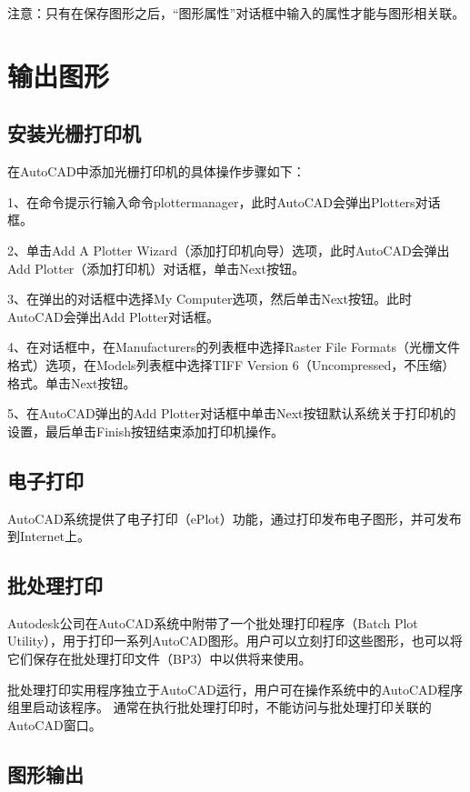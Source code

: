 注意：只有在保存图形之后，“图形属性”对话框中输入的属性才能与图形相关联。

\chapter{输出图形}





\section{安装光栅打印机}

在AutoCAD中添加光栅打印机的具体操作步骤如下：

1、在命令提示行输入命令plottermanager，此时AutoCAD会弹出Plotters对话框。

2、单击Add A Plotter Wizard（添加打印机向导）选项，此时AutoCAD会弹出Add Plotter（添加打印机）对话框，单击Next按钮。

3、在弹出的对话框中选择My Computer选项，然后单击Next按钮。此时AutoCAD会弹出Add Plotter对话框。

4、在对话框中，在Manufacturers的列表框中选择Raster File Formats（光栅文件格式）选项，在Models列表框中选择TIFF Version 6（Uncompressed，不压缩）格式。单击Next按钮。

5、在AutoCAD弹出的Add Plotter对话框中单击Next按钮默认系统关于打印机的设置，最后单击Finish按钮结束添加打印机操作。

\section{电子打印}

AutoCAD系统提供了电子打印（ePlot）功能，通过打印发布电子图形，并可发布到Internet上。

\section{批处理打印}

Autodesk公司在AutoCAD系统中附带了一个批处理打印程序（Batch Plot Utility），用于打印一系列AutoCAD图形。用户可以立刻打印这些图形，也可以将它们保存在批处理打印文件（BP3）中以供将来使用。

批处理打印实用程序独立于AutoCAD运行，用户可在操作系统中的AutoCAD程序组里启动该程序。
通常在执行批处理打印时，不能访问与批处理打印关联的AutoCAD窗口。

\section{图形输出}

